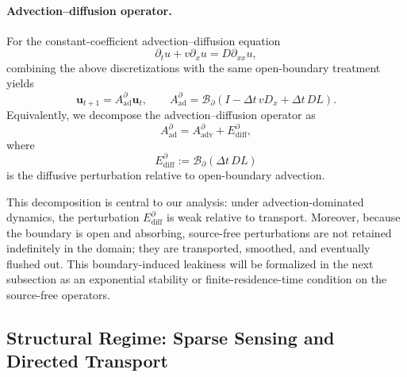 \paragraph{Advection--diffusion operator.}
For the constant-coefficient advection--diffusion equation
\begin{equation}
\partial_t u + v\partial_x u = D \partial_{xx}u, \nonumber
\end{equation}
combining the above discretizations with the same open-boundary treatment yields
\begin{equation}
\mathbf{u}_{t+1}
=
A_{\mathrm{ad}}^{\partial}\mathbf{u}_t,
\qquad
A_{\mathrm{ad}}^{\partial}
=
\mathcal{B}_{\partial}
\left(I-\Delta t\,vD_x+\Delta t\,D L\right).
\label{eq:Aad_def}
\end{equation}
Equivalently, we decompose the advection--diffusion operator as
\begin{equation}
A_{\mathrm{ad}}^{\partial}
=
A_{\mathrm{adv}}^{\partial}
+
E_{\mathrm{diff}}^{\partial},
\label{eq:Aad_split}
\end{equation}
where
\begin{equation}
E_{\mathrm{diff}}^{\partial}
:=
\mathcal{B}_{\partial}
\left(\Delta t\,D L\right)
\label{eq:Ediff_def}
\end{equation}
is the diffusive perturbation relative to open-boundary advection.

This decomposition is central to our analysis: under advection-dominated dynamics, the perturbation $E_{\mathrm{diff}}^{\partial}$ is weak relative to transport. Moreover, because the boundary is open and absorbing, source-free perturbations are not retained indefinitely in the domain; they are transported, smoothed, and eventually flushed out. This boundary-induced leakiness will be formalized in the next subsection as an exponential stability or finite-residence-time condition on the source-free operators.


\subsection{Structural Regime: Sparse Sensing and Directed Transport}

